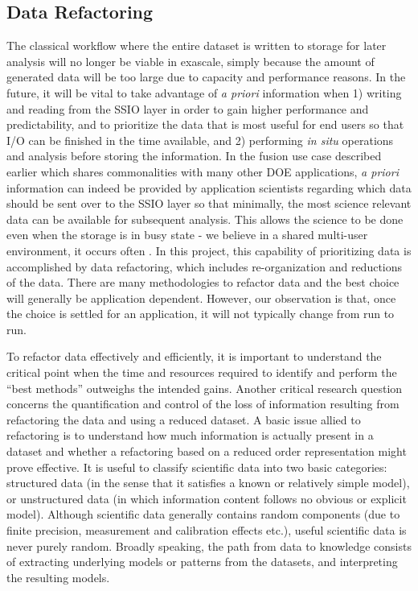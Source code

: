 \subsection{Data Refactoring} \label{sec:data-refactor} 

The classical workflow where the entire dataset is written to storage for
later analysis will no longer be viable in exascale, simply because the amount of generated data will 
be too large due to capacity and performance reasons.
In the future, it will be vital to take advantage of \textit{a priori}
information when 1) writing and reading from the SSIO layer in order to gain
higher performance and predictability, and to prioritize the data that
is most useful for end users so that I/O can be finished in the time available, and 2)
performing {\em in situ} operations and analysis before storing the information.
In the fusion use case described earlier which shares commonalities with many other
DOE applications, \textit{a priori} information can indeed be provided by application
scientists regarding which data should be sent over to the SSIO layer so that
minimally, the most science relevant data can be available for subsequent analysis.
This allows the science to be done even when the storage is in busy state - we believe
in a shared multi-user environment, it occurs often \cite{liu_hotstorage}.
In this project, this capability of prioritizing data is accomplished by data refactoring, 
which includes re-organization and reductions of the data.
There are many methodologies to refactor data and the best choice will generally
be application dependent. However, our observation is that, once the choice is settled for an application, 
it will not typically change from run to run. 

To refactor data effectively and efficiently, it is important to understand
the critical point when the time and resources required to
identify and perform the ``best methods'' outweighs the intended gains. Another
critical research question concerns the quantification and control of the loss
of information resulting from refactoring the data and using a reduced dataset. 
A basic issue allied to refactoring is to understand how much information is
actually present in a dataset and whether a refactoring based on a reduced
order representation might prove effective. It is useful to classify scientific
data into two basic categories: structured data (in the sense that it satisfies
a known or relatively simple model), or unstructured data (in which information
content follows no obvious or explicit model).  Although scientific data
generally contains random components (due to finite precision, measurement and
calibration effects etc.), useful scientific data is never purely random.
Broadly speaking, the path from data to knowledge consists of extracting
underlying models or patterns from the datasets, and interpreting the resulting
models. 

